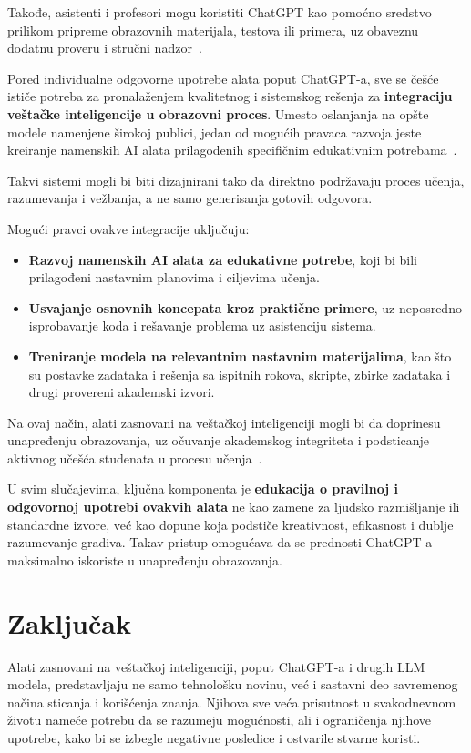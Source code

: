 \documentclass[a4paper, 12pt]{article}
\begin{document}
Takođe, asistenti i profesori mogu koristiti ChatGPT kao pomoćno sredstvo prilikom pripreme obrazovnih materijala, testova ili primera, uz obaveznu dodatnu proveru i stručni nadzor~\cite{openai2023}. 

Pored individualne odgovorne upotrebe alata poput ChatGPT-a, sve se češće ističe potreba za pronalaženjem kvalitetnog i sistemskog rešenja za \textbf{integraciju veštačke inteligencije u obrazovni proces}. Umesto oslanjanja na opšte modele namenjene širokoj publici, jedan od mogućih pravaca razvoja jeste kreiranje namenskih AI alata prilagođenih specifičnim edukativnim potrebama~\cite{seminarMilos}.

Takvi sistemi mogli bi biti dizajnirani tako da direktno podržavaju proces učenja, razumevanja i vežbanja, a ne samo generisanja gotovih odgovora. 

Mogući pravci ovakve integracije uključuju:
\begin{itemize}
    \item \textbf{Razvoj namenskih AI alata za edukativne potrebe}, koji bi bili prilagođeni
    nastavnim planovima i ciljevima učenja.
    \item \textbf{Usvajanje osnovnih koncepata kroz praktične primere}, uz neposredno
    isprobavanje koda i rešavanje problema uz asistenciju sistema.
    \item \textbf{Treniranje modela na relevantnim nastavnim materijalima}, kao što su
    postavke zadataka i rešenja sa ispitnih rokova, skripte, zbirke zadataka i drugi
    provereni akademski izvori.
\end{itemize}

Na ovaj način, alati zasnovani na veštačkoj inteligenciji mogli bi da doprinesu unapređenju obrazovanja, uz očuvanje akademskog integriteta i podsticanje aktivnog učešća studenata u procesu učenja~\cite{seminarMilos}. 

U svim slučajevima, ključna komponenta je \textbf{edukacija o pravilnoj i odgovornoj upotrebi ovakvih alata} ne kao zamene za ljudsko razmišljanje ili standardne izvore, već kao dopune koja podstiče kreativnost, efikasnost i dublje razumevanje gradiva. Takav pristup omogućava da se prednosti ChatGPT-a maksimalno iskoriste u unapređenju obrazovanja.



\section{Zaključak}

Alati zasnovani na veštačkoj inteligenciji, poput ChatGPT-a i drugih LLM modela, predstavljaju ne samo tehnološku novinu, već i sastavni deo savremenog načina sticanja i korišćenja znanja. Njihova sve veća prisutnost u svakodnevnom životu nameće potrebu da se razumeju mogućnosti, ali i ograničenja njihove upotrebe, kako bi se izbegle negativne posledice i ostvarile stvarne koristi.
\end{document}
